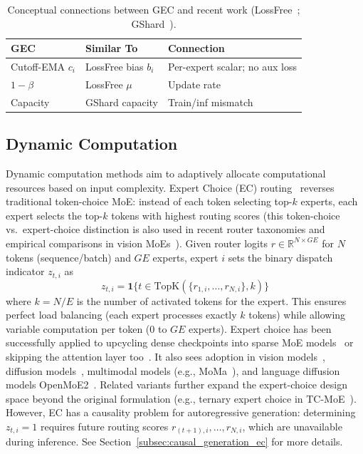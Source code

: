 \documentclass{article}
\theoremstyle{plain}
\theoremstyle{definition}
\theoremstyle{remark}
\begin{document}
\begin{table}[t]
\centering
\caption{Conceptual connections between GEC and recent work (LossFree~\cite{wang2024auxiliarylossfreeloadbalancingstrategy}; GShard~\cite{fedus2022switch}).}
\label{tab:conceptual_mapping}
\small
\begin{tabularx}{\columnwidth}{@{}>{\raggedright\arraybackslash}X>{\raggedright\arraybackslash}X>{\raggedright\arraybackslash}X@{}}
\toprule
\textbf{GEC} & \textbf{Similar To} & \textbf{Connection} \\
\midrule
Cutoff-EMA $c_i$ & LossFree bias $b_i$ & Per-expert scalar; no aux loss \\
\midrule
$1 - \beta$ & LossFree $\mu$ & Update rate \\
\midrule
Capacity & GShard capacity & Train/inf mismatch \\
\bottomrule
\end{tabularx}
\end{table}

\subsection{Dynamic Computation}

Dynamic computation methods aim to adaptively allocate computational resources based on input complexity. Expert Choice (EC) routing~\cite{zhou2022mixture} reverses traditional token-choice MoE: instead of each token selecting top-$k$ experts, each expert selects the top-$k$ tokens with highest routing scores (this token-choice vs.\ expert-choice distinction is also used in recent router taxonomies and empirical comparisons in vision MoEs~\cite{liu2024routersvision}). Given router logits $r \in \mathbb{R}^{N \times GE}$ for $N$ tokens (sequence/batch) and $GE$ experts, expert $i$ sets the binary dispatch indicator $z_{t,i}$ as
$$z_{t,i} = \mathbf{1}\{t \in \text{TopK}(\{r_{1,i}, \ldots, r_{N,i}\}, k)\}$$
where $k = N/E$ is the number of activated tokens for the expert.
This ensures perfect load balancing (each expert processes exactly $k$ tokens) while allowing variable computation per token (0 to $GE$ experts). Expert choice has been successfully applied to upcycling dense checkpoints into sparse MoE models~\cite{komatsuzaki2023sparse} or skipping the attention layer too~\cite{raposo2024mixture}. It also sees adoption in vision models~\cite{liu2024routersvision}, diffusion models~\cite{sun2024ecdit, shi2025diffmoe}, multimodal models (e.g., MoMa~\cite{lin2024moma}), and language diffusion models OpenMoE2~\cite{ni2025openmoe2}. Related variants further expand the expert-choice design space beyond the original formulation (e.g., ternary expert choice in TC-MoE~\cite{yan2025tcmoe}).
However, EC has a causality problem for autoregressive generation: determining $z_{t,i}=1$ requires future routing scores $r_{(t+1),i}, \ldots, r_{N,i}$, which are unavailable during inference. See Section~\ref{subsec:causal_generation_ec} for more details.
\end{document}

